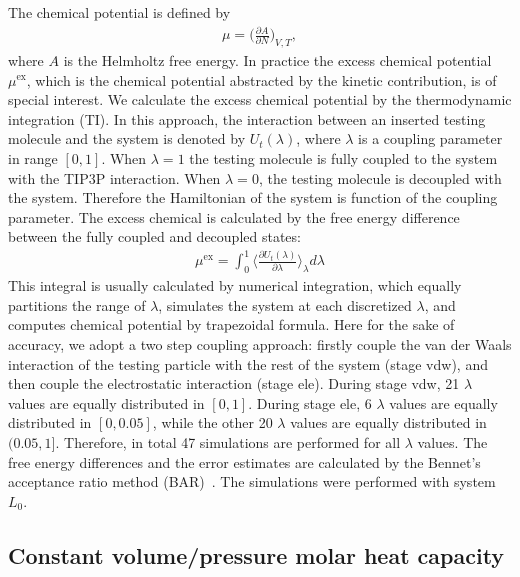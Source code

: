 \documentclass[a4paper,preprint,unsortedaddress,onecolumn,fleqn]{revtex4}
\begin{document}
The chemical potential is defined by 
\begin{align}
\mu = \Big(\frac{\partial A}{\partial N}\Big)_{V,T},
\end{align}
where $A$ is the Helmholtz free energy. In practice the excess chemical
potential $\mu^\text{ex}$, which is the chemical potential abstracted by the
kinetic contribution, is of special interest. We calculate the excess
chemical potential by the thermodynamic integration (TI). In this approach,
the interaction between an inserted testing molecule and the system is
denoted by $U_t(\lambda)$, where $\lambda$ is a coupling parameter in range $%
[0,1]$. When $\lambda = 1$ the testing molecule is fully coupled to the
system with the TIP3P interaction. When $\lambda=0$, the testing molecule is
decoupled with the system. Therefore the Hamiltonian of the system is
function of the coupling parameter. The excess chemical is calculated by the
free energy difference between the fully coupled and decoupled states: 
\begin{align}
\mu^\text{ex} = \int_0^1 \Big\langle \frac{\partial U_t(\lambda)}{\partial
\lambda} \Big\rangle_\lambda d\lambda
\end{align}
This integral is usually calculated by numerical integration, which equally
partitions the range of $\lambda$, simulates the system at each discretized $%
\lambda$, and computes chemical potential by trapezoidal formula. Here for
the sake of accuracy, we adopt a two step coupling approach: firstly couple
the van der Waals interaction of the testing particle with the rest of the
system (stage vdw), and then couple the electrostatic interaction (stage
ele). During stage vdw, 21 $\lambda$ values are equally distributed in $%
[0,1] $. During stage ele, 6 $\lambda$ values are equally distributed in $%
[0,0.05]$, while the other 20 $\lambda$ values are equally distributed in $%
(0.05, 1]$. Therefore, in total 47 simulations are performed for all $%
\lambda $ values. The free energy differences and the error estimates are
calculated by the Bennet's acceptance ratio method (BAR)~\cite%
{bennett1976efficient}. The simulations were performed with system $L_0$.

\subsection{Constant volume/pressure molar heat capacity}
\end{document}
